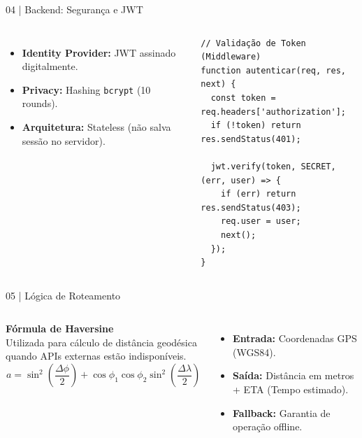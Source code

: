 \documentclass[aspectratio=169,12pt]{beamer}
\begin{document}
\begin{frame}[fragile]{04 | Backend: Segurança e JWT}
  \begin{columns}[T]
      \begin{itemize}
        \item \textbf{Identity Provider:} JWT assinado digitalmente.
        \item \textbf{Privacy:} Hashing \texttt{bcrypt} (10 rounds).
        \item \textbf{Arquitetura:} Stateless (não salva sessão no servidor).
      \end{itemize}
      \begin{lstlisting}
// Validação de Token (Middleware)
function autenticar(req, res, next) {
  const token = req.headers['authorization'];
  if (!token) return res.sendStatus(401);
  
  jwt.verify(token, SECRET, (err, user) => {
    if (err) return res.sendStatus(403);
    req.user = user;
    next();
  });
}
      \end{lstlisting}
  \end{columns}
\end{frame}

\begin{frame}{05 | Lógica de Roteamento}
  \begin{columns}[T]
      \textbf{Fórmula de Haversine} \\
      Utilizada para cálculo de distância geodésica quando APIs externas estão indisponíveis.
      \vspace{0.5cm}
      \begin{equation*}
        a = \sin^2\left(\frac{\Delta\phi}{2}\right) + \cos\phi_1\cos\phi_2\sin^2\left(\frac{\Delta\lambda}{2}\right)
      \end{equation*}
      \begin{itemize}
        \item \textbf{Entrada:} Coordenadas GPS (WGS84).
        \item \textbf{Saída:} Distância em metros + ETA (Tempo estimado).
        \item \textbf{Fallback:} Garantia de operação offline.
      \end{itemize}
  \end{columns}
\end{frame}
\end{document}
